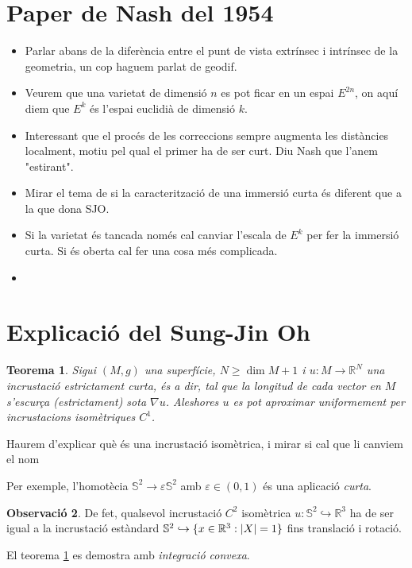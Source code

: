 \documentclass[11pt,a4paper,openright,oneside]{book}
\DeclarePairedDelimiter{\set}{\{}{\}}
\numberwithin{equation}{section}
\newtheorem{teo}{Teorema}[section]
\theoremstyle{definition}
\newtheorem{obs}[teo]{Observaci\'o}
\begin{document}
\section{Paper de Nash del 1954}
{
\color{blue}
\begin{itemize}
    \item Parlar abans de la diferència entre el punt de vista extrínsec i intrínsec de la geometria, un cop haguem parlat de geodif. 
    \item Veurem que una varietat de dimensió $n$ es pot ficar en un espai $E^{2n}$, on aquí diem que $E^k$ és l'espai euclidià de dimensió $k$.
    \item Interessant que el procés de les correccions sempre augmenta les distàncies localment, motiu pel qual el primer ha de ser curt. Diu Nash que l'anem "estirant".
    \item Mirar el tema de si la caracterització de una immersió curta és diferent que a la que dona SJO.
    \item Si la varietat és tancada només cal canviar l'escala de $E^k$ per fer la immersió curta. Si és oberta cal fer una cosa més complicada.
    \item 
\end{itemize}

}


\newpage
\section{Explicació del Sung-Jin Oh}
\begin{teo}\label{teo: SJO} Sigui $(M,g)$ una superfície, $N\ge\dim M+1$ i $u:M\to\mathbb R^N$ una incrustació estrictament curta, és a dir, tal que la longitud de cada vector en $M$ s'escurça (estrictament) sota $\nabla u$. Aleshores $u$ es pot aproximar uniformement per incrustacions isomètriques $C^1$.
\end{teo}
{\color{blue} Haurem d'explicar què és una incrustació isomètrica, i mirar si cal que li canviem el nom}

Per exemple, l'homotècia $\mathbb S^2\to\varepsilon\mathbb S^2$ amb $\varepsilon\in(0,1)$ és una aplicació \textit{curta}. 
\begin{obs}
De fet, qualsevol incrustació $C^2$ isomètrica $u:\mathbb S^2\hookrightarrow\mathbb R^3$ ha de ser igual a la incrustació estàndard $\mathbb S^2 \hookrightarrow\set{ x\in\mathbb R^3 : |X| = 1 }$ fins translació i rotació. 
\end{obs}

El teorema \ref{teo: SJO} es demostra amb \textit{integració convexa}.
\end{document}
